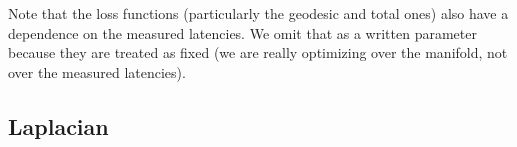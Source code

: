 \documentclass[10pt]{article}
\begin{document}
	Note that the loss functions (particularly the geodesic and total ones) also have a dependence on the measured latencies. We omit that as a written parameter because they are treated as fixed (we are really optimizing over the manifold, not over the measured latencies).

	\subsection{Laplacian}
	
\end{document}
